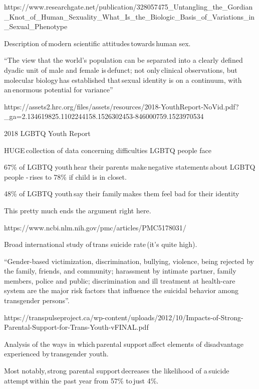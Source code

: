 \documentclass[12 pt, a4paper]{article}
\begin{document}
\bigskip

https://www.researchgate.net/publication/328057475\_Untangling\_the\_Gordian\_Knot\_of\_Human\_Sexuality\_What\_Is\_the\_Biologic\_Basis\_of\_Variations\_in\_Sexual\_Phenotype

Description of modern scientific attitudes towards human sex. 

“The view that the world’s population can be separated into a clearly defined dyadic unit of male and female is defunct; not only clinical observations, but molecular biology has established that sexual identity is on a continuum, with an enormous potential for variance” 

\bigskip

https://assets2.hrc.org/files/assets/resources/2018-YouthReport-NoVid.pdf?\_ga=2.134619825.1102244158.1526302453-846000759.1523970534 

2018 LGBTQ Youth Report 

HUGE collection of data concerning difficulties LGBTQ people face 

67\% of LGBTQ youth hear their parents make negative statements about LGBTQ people - rises to 78\% if child is in closet. 

48\% of LGBTQ youth say their family makes them feel bad for their identity 

This pretty much ends the argument right here. 

\bigskip

https://www.ncbi.nlm.nih.gov/pmc/articles/PMC5178031/ 

Broad international study of trans suicide rate (it’s quite high). 

“Gender-based victimization, discrimination, bullying, violence, being rejected by the family, friends, and community; harassment by intimate partner, family members, police and public; discrimination and ill treatment at health-care system are the major risk factors that influence the suicidal behavior among transgender persons”. 

\bigskip

https://transpulseproject.ca/wp-content/uploads/2012/10/Impacts-of-Strong-Parental-Support-for-Trans-Youth-vFINAL.pdf 

Analysis of the ways in which parental support affect elements of disadvantage experienced by transgender youth. 

Most notably, strong parental support decreases the likelihood of a suicide attempt within the past year from 57\% to just 4\%. 
\end{document}
